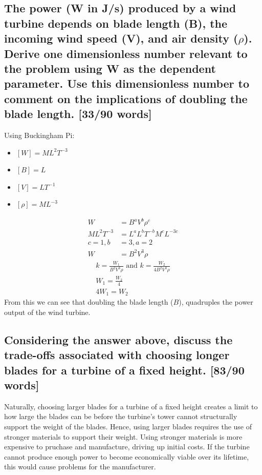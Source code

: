 \documentclass[12pt]{article}
\numberwithin{equation}{section}
\begin{document}
\begin{flushleft}
\subsection[Dimensionless number derivation.]{The power (W in J/s) produced by a wind turbine depends on blade length (B), the incoming wind speed (V), and air density (\(\rho\)). Derive one dimensionless number relevant to the problem using W as the dependent parameter. Use this dimensionless number to comment on the implications of doubling the blade length. [33/90 words]}
Using Buckingham Pi:
\begin{multicols}{2}
  \begin{itemize}
    \item $[W] = ML^2T^{-3}$
    \item $[B] = L$
    \item $[V] = LT^{-1}$
    \item $[\rho] = ML^{-3}$
  \end{itemize}
\end{multicols}
\begin{align}
  W &= B^a V^b \rho^c\\
  ML^2T^{-3} &= L^a L^b T^{-b} M^c L^{-3c}\\
  c = 1, b &= 3, a = 2\\
  W &= B^2 V^3 \rho
\end{align}
\begin{gather}
  k = \frac{W_1}{B^2 V^3 \rho} \textrm{ and } k = \frac{W_2}{4B^2 V^3 \rho}\\
  W_1 = \frac{W_2}{4} \\
  4W_1 = W_2
\end{gather}
From this we can see that doubling the blade length (\(B\)), quadruples the power output of the wind turbine.

\subsection[Trade-offs with longer blade.]{Considering the answer above, discuss the trade-offs associated with choosing longer blades for a turbine of a fixed height. [83/90 words]}
Naturally, choosing larger blades for a turbine of a fixed height creates a limit to how large the blades can be before the turbine’s tower cannot structurally support the weight of the blades. Hence, using larger blades requires the use of stronger materials to support their weight. Using stronger materials is more expensive to pruchase and manufacture, driving up initial costs. If the turbine cannot produce enough power to become economically viable over its lifetime, this would cause problems for the manufacturer.


\end{flushleft}
\end{document}
